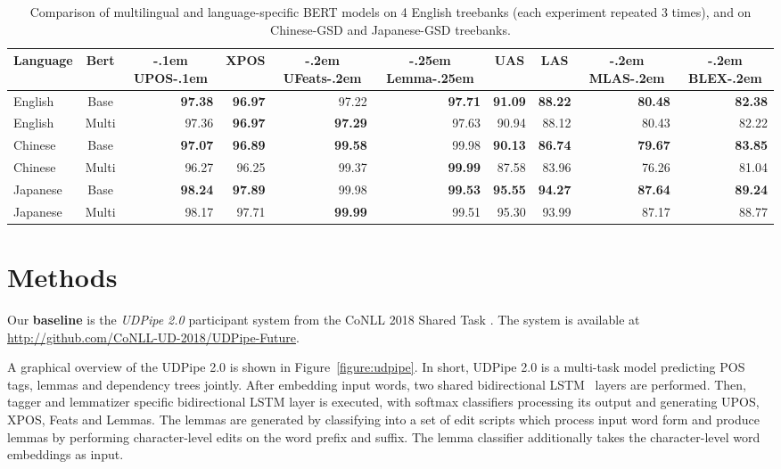 \documentclass[11pt,a4paper]{article}
\begin{document}
\begin{table*}[t]
  \begin{center}
\begin{tabular}{l|c||r|r|r|r|r|r|r|r}
\multicolumn{1}{c|}{Language} & \multicolumn{1}{c||}{Bert} & \multicolumn{1}{c|}{\kern-.1em UPOS\kern-.1em} & \multicolumn{1}{c|}{XPOS} & \multicolumn{1}{c|}{\kern-.2em UFeats\kern-.2em} & \multicolumn{1}{c|}{\kern-.25em Lemma\kern-.25em} & \multicolumn{1}{c|}{UAS} & \multicolumn{1}{c|}{LAS} & \multicolumn{1}{c|}{\kern-.2em MLAS\kern-.2em} & \multicolumn{1}{c}{\kern-.2em BLEX\kern-.2em}\\\hline\hline
English & Base & \bf 97.38 & \bf 96.97 & 97.22 & \bf 97.71 & \bf 91.09 & \bf 88.22 & \bf 80.48 & \bf 82.38\\\hline
English & Multi & 97.36 & \bf 96.97 & \bf 97.29 & 97.63 & 90.94 & 88.12 & 80.43 & 82.22\\\hline
\hline
Chinese & Base & \bf 97.07 & \bf 96.89 & \bf 99.58 & 99.98 & \bf 90.13 & \bf 86.74 & \bf 79.67 & \bf 83.85\\\hline
Chinese & Multi & 96.27 & 96.25 & 99.37 & \bf 99.99 & 87.58 & 83.96 & 76.26 & 81.04\\\hline
\hline
Japanese & Base & \bf 98.24 & \bf 97.89 & 99.98 & \bf 99.53 & \bf 95.55 & \bf 94.27 & \bf 87.64 & \bf 89.24\\\hline
Japanese & Multi & 98.17 & 97.71 & \bf 99.99 & 99.51 & 95.30 & 93.99 & 87.17 & 88.77\\\hline
\end{tabular}
   \end{center}
  \caption{Comparison of multilingual and language-specific BERT models on
  4 English treebanks (each experiment repeated 3 times), and on Chinese-GSD and Japanese-GSD treebanks.}
  \label{table:bert_langs}
\end{table*}

\section{Methods}
\label{section:methods}

Our \textbf{baseline} is the \textit{UDPipe 2.0} \cite{UDPipe2.0} participant
system from the CoNLL 2018 Shared Task \cite{CoNLL2018}. The system is
available at {\small\url{http://github.com/CoNLL-UD-2018/UDPipe-Future}}.

A graphical overview of the UDPipe 2.0 is shown in Figure~\ref{figure:udpipe}.
In short, UDPipe 2.0 is a multi-task model predicting POS tags,
lemmas and dependency trees jointly. After embedding input words, two shared
bidirectional LSTM~\citep{Hochreiter:1997:LSTM} layers are performed. Then,
tagger and lemmatizer specific bidirectional LSTM layer is executed, with
softmax classifiers processing its output and generating UPOS, XPOS, Feats and
Lemmas. The lemmas are generated by classifying into a set of edit scripts
which process input word form and produce lemmas by performing character-level
edits on the word prefix and suffix. The lemma classifier additionally takes
the character-level word embeddings as input.
\end{document}
